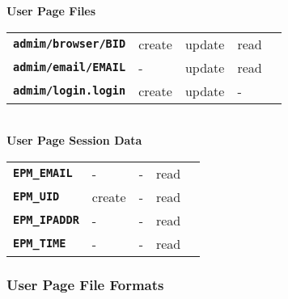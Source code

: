 \documentclass[12pt]{article}
\newcommand{\TT}[1]{{\tt \bfseries #1}}
\begin{document}
\begin{center}
{\bf User Page Files}
\\[1ex]
\begin{tabular}{lllll}
\TT{admim/browser/BID}	& create  & update & read \\
\TT{admim/email/EMAIL}	& -       & update & read \\
\TT{admim/login.login}	& create  & update & -    \\
\end{tabular}
\\[3ex]
{\bf User Page Session Data}
\\[1ex]
\begin{tabular}{lllll}
\TT{EPM\_EMAIL}	& -       & -      & read \\
\TT{EPM\_UID}	& create  & -      & read \\
\TT{EPM\_IPADDR}& -       & -      & read \\
\TT{EPM\_TIME}
                & -       & -      & read \\
\end{tabular}
\end{center}

\subsubsection{User Page File Formats}
\end{document}
